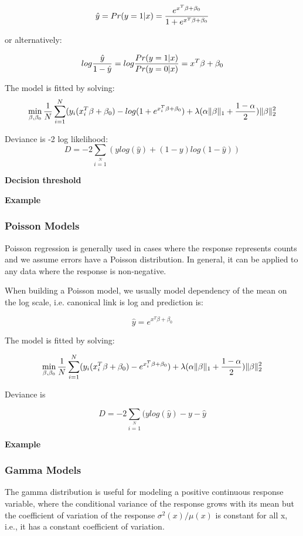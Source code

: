 \documentclass[11pt]{article}
\begin{document}
\[ \hat{y} = Pr(y = 1|x) = {e^{x^T\beta + \beta_0} \over 1 + e^{x^T \beta + \beta_0} } \]

or alternatively:


\[log {\hat{y} \over 1- \hat{y}} = log{Pr(y=1|x) \over Pr(y=0|x)} = x^T \beta + \beta_0\]

The model is fitted by solving:
\[  \min\limits_{\beta,\beta_0} { {1 \over N}\sum\limits_{i=1}\limits^{N}(y_i (x_i^{T}\beta  + \beta_0) - log (1 + e^{x_i^{T}\beta  + \beta_0} )  + \lambda (\alpha \|\beta \|_1 + {1-\alpha \over 2}) \| \beta \|_2^2} \]

Deviance is -2 log likelihood:
\[D = -2\sum\limits_{i=1}\limits^{N}{(y log(\hat{y}) + (1 - y)log(1-\hat{y})  )}\]

\textbf{Decision threshold}

\textbf{Example}

\subsubsection{Poisson Models}
Poisson regression is generally used in cases where the response represents counts and we assume errors have a Poisson distribution. In general, it can be applied to any data where the response is non-negative. 

When building a Poisson model, we usually model dependency of the mean on the log scale, i.e. canonical link is log and prediction is:

\[\hat{y} = e^{x^T\beta + \beta_0}\]

The model is fitted by solving:

\[  \min\limits_{\beta,\beta_0} { {1 \over N}\sum\limits_{i=1}\limits^{N}(y_i (x_i^{T}\beta  + \beta_0) - e^{x_i^{T}\beta  + \beta_0})  + \lambda (\alpha \|\beta \|_1 + {1-\alpha \over 2}) \| \beta \|_2^2} \]

Deviance is 

\[D = -2\sum\limits_{i=1}\limits^{N}{(y log(\hat{y}) - y - \hat{y}}\]


\textbf{Example}

\subsubsection{Gamma Models}
The gamma distribution is useful for modeling a positive continuous response variable, where the conditional variance of the response grows with its mean but  the coefficient of variation of the response $\sigma^2(x)/μ(x)$ is constant for all x,  i.e., it has a constant coefficient of variation.
\end{document}
